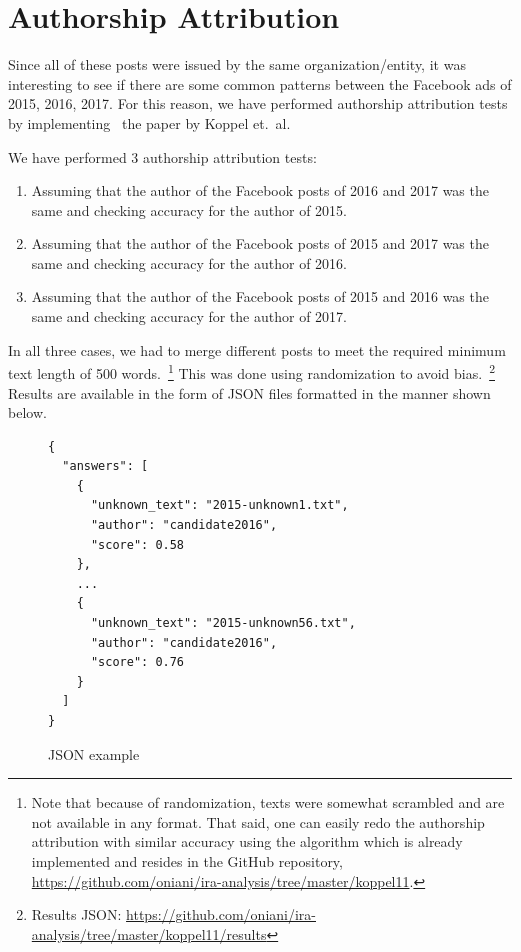\documentclass[12pt]{article}
\theoremstyle{definition}
\begin{document}

\section*{\centering Authorship Attribution}

Since all of these posts were issued by the same organization/entity, it was
interesting to see if there are some common patterns between the Facebook ads
of 2015, 2016, 2017. For this reason, we have performed authorship attribution
tests by implementing~\cite{koppel11} the paper by Koppel et.~al.

\bigskip

We have performed 3 authorship attribution tests:

\begin{enumerate}
  \item Assuming that the author of the Facebook posts of 2016 and 2017 was the
        same and checking accuracy for the author of 2015.

  \item Assuming that the author of the Facebook posts of 2015 and 2017 was the
        same and checking accuracy for the author of 2016.

  \item Assuming that the author of the Facebook posts of 2015 and 2016 was the
        same and checking accuracy for the author of 2017.
\end{enumerate}

In all three cases, we had to merge different posts to meet the required
minimum text length of 500 words.~\footnote{Note that because of randomization,
texts were somewhat scrambled and are not available in any format. That said,
one can easily redo the authorship attribution with similar accuracy using the
algorithm which is already implemented and resides in the GitHub repository,
\url{https://github.com/oniani/ira-analysis/tree/master/koppel11}.} This was
done using randomization to avoid bias.~\footnote{Results JSON:
\url{https://github.com/oniani/ira-analysis/tree/master/koppel11/results}}
Results are available in the form of JSON files formatted in the manner shown
below.

\begin{figure}[H]
\begin{verbatim}
{
  "answers": [
    {
      "unknown_text": "2015-unknown1.txt",
      "author": "candidate2016",
      "score": 0.58
    },
    ...
    {
      "unknown_text": "2015-unknown56.txt",
      "author": "candidate2016",
      "score": 0.76
    }
  ]
}
\end{verbatim}
\caption{JSON example}
\end{figure}
\end{document}
